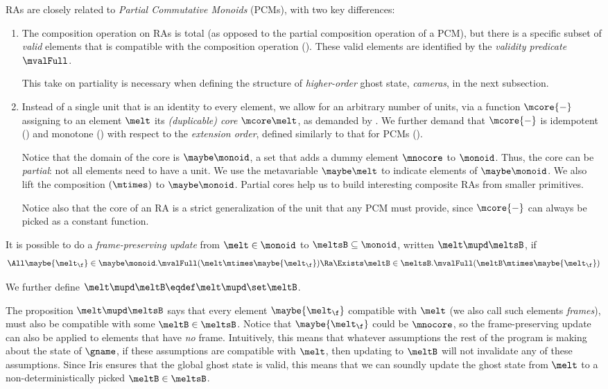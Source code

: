 RAs are closely related to \emph{Partial Commutative Monoids} (PCMs), with two key differences:
\begin{enumerate}
\item The composition operation on RAs is total (as opposed to the partial composition operation of a PCM), but there is a specific subset of \emph{valid} elements that is compatible with the composition operation ().
These valid elements are identified by the \emph{validity predicate} $\mvalFull$.

This take on partiality is necessary when defining the structure of \emph{higher-order} ghost state, \emph{cameras}, in the next subsection.

\item Instead of a single unit that is an identity to every element, we allow
for an arbitrary number of units, via a function $\mcore{{-}}$ assigning to an element $\melt$ its \emph{(duplicable) core} $\mcore\melt$, as demanded by .
  We further demand that $\mcore{{-}}$ is idempotent () and monotone () with respect to the \emph{extension order}, defined similarly to that for PCMs ().

  Notice that the domain of the core is $\maybe\monoid$, a set that adds a dummy element $\mnocore$ to $\monoid$.
  Thus, the core can be \emph{partial}: not all elements need to have a unit.
  We use the metavariable $\maybe\melt$ to indicate elements of  $\maybe\monoid$.
  We also lift the composition $(\mtimes)$ to $\maybe\monoid$.
  Partial cores help us to build interesting composite RAs from smaller primitives.

Notice also that the core of an RA is a strict generalization of the unit that any PCM must provide, since $\mcore{{-}}$ can always be picked as a constant function.
\end{enumerate}


\begin{defn}
  It is possible to do a \emph{frame-preserving update} from $\melt \in \monoid$ to $\meltsB \subseteq \monoid$, written $\melt \mupd \meltsB$, if
  \[ \All \maybe{\melt_\f} \in \maybe\monoid. \mvalFull(\melt \mtimes \maybe{\melt_\f}) \Ra \Exists \meltB \in \meltsB. \mvalFull(\meltB \mtimes \maybe{\melt_\f}) \]

  We further define $\melt \mupd \meltB \eqdef \melt \mupd \set\meltB$.
\end{defn}
The proposition $\melt \mupd \meltsB$ says that every element $\maybe{\melt_\f}$ compatible with $\melt$ (we also call such elements \emph{frames}), must also be compatible with some $\meltB \in \meltsB$.
Notice that $\maybe{\melt_\f}$ could be $\mnocore$, so the frame-preserving update can also be applied to elements that have \emph{no} frame.
Intuitively, this means that whatever assumptions the rest of the program is making about the state of $\gname$, if these assumptions are compatible with $\melt$, then updating to $\meltB$ will not invalidate any of these assumptions.
Since Iris ensures that the global ghost state is valid, this means that we can soundly update the ghost state from $\melt$ to a non-deterministically picked $\meltB \in \meltsB$.


